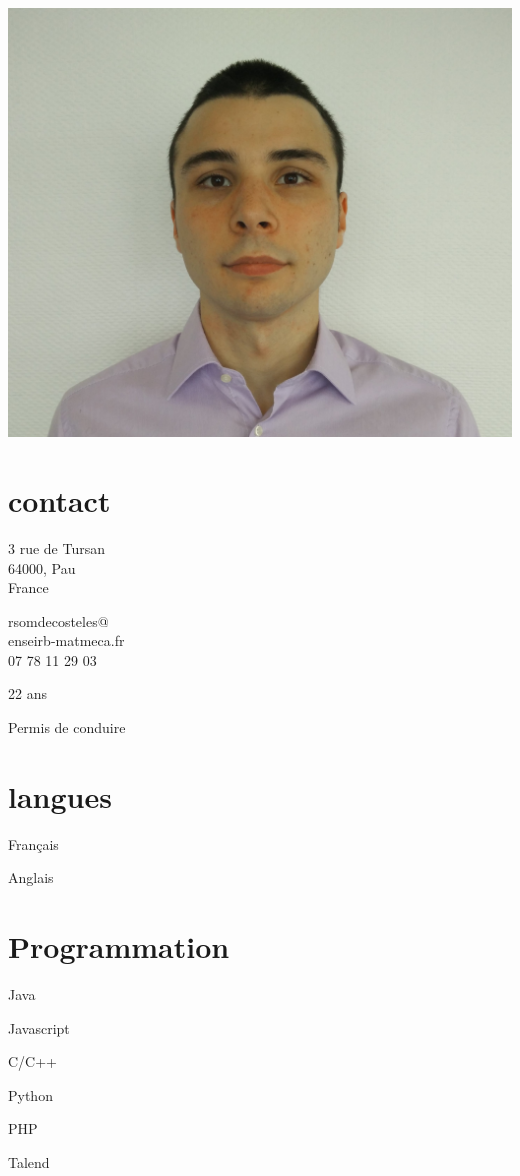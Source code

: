 \begin{aside}
%
\includegraphics[width=1\textwidth]{photo.jpg}
\section{contact}
    \item{
        3 rue de Tursan\\
        64000, Pau\\
        France
    }
    \item{
        rsomdecosteles@\\enseirb-matmeca.fr\\
        07 78 11 29 03
    }
    \item 22 ans
    \item Permis de conduire

\section{langues}
    \item Français
    \item Anglais

\section{Programmation}
    \item Java
    \item Javascript
    \item C/C++
    \item Python
    \item PHP
    \item Talend
\end{aside}